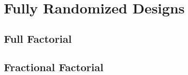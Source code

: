 









\section{Fully Randomized Designs}

\subsection{Full Factorial}

\subsection{Fractional Factorial}

